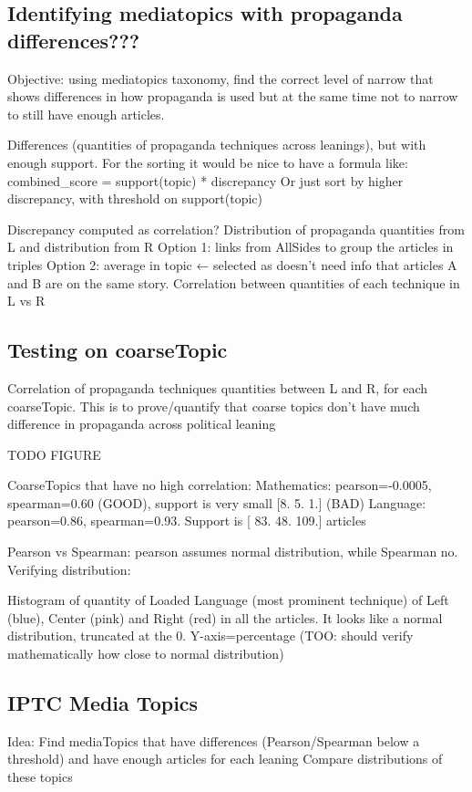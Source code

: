 \subsection{Identifying mediatopics with propaganda differences???}

Objective: using mediatopics taxonomy, find the correct level of narrow that shows differences in how propaganda is used but at the same time not to narrow to still have enough articles.

Differences (quantities of propaganda techniques across leanings), but with enough support. For the sorting it would be nice to have a formula like: 
combined\_score = support(topic) * discrepancy
Or just sort by higher discrepancy, with threshold on support(topic)

Discrepancy computed as correlation?
Distribution of propaganda quantities from L and distribution from R
Option 1: links from AllSides to group the articles in triples
Option 2: average in topic ← selected as doesn’t need info that articles A and B are on the same story. Correlation between quantities of each technique in L vs R

\subsection{Testing on coarseTopic}
Correlation of propaganda techniques quantities between L and R, for each coarseTopic. This is to prove/quantify that coarse topics don’t have much difference in propaganda across political leaning

TODO FIGURE

CoarseTopics that have no high correlation:
Mathematics: pearson=-0.0005, spearman=0.60 (GOOD), support is very small [8. 5. 1.] (BAD)
Language: pearson=0.86, spearman=0.93. Support is [ 83.  48. 109.] articles

Pearson vs Spearman: pearson assumes normal distribution, while Spearman no.
Verifying distribution:

Histogram of quantity of Loaded Language (most prominent technique) of Left (blue), Center (pink) and Right (red) in all the articles. It looks like a normal distribution, truncated at the 0. Y-axis=percentage (TOO: should verify mathematically how close to normal distribution)

\subsection{IPTC Media Topics}
Idea:
Find mediaTopics that have differences (Pearson/Spearman below a threshold) and have enough articles for each leaning
Compare distributions of these topics

